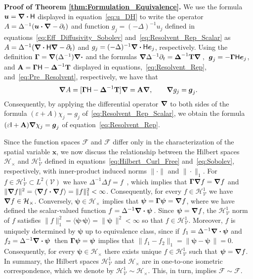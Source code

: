 \documentclass[leqno,onefignum,onetabnum]{siamltex1213}
\newcommand{\Tb}{\mathbf{T}}
\newcommand{\Ab}{\mathbf{A}}
\newcommand{\Vc}{\mathcal{V}}
\newcommand{\Hc}{\mathcal{H}}
\newcommand{\Fc}{\mathcal{F}}
\newcommand{\Hm}{\mathsf{H}}
\newcommand{\Ib}{\mathsf{I}}
\newcommand{\Hs}{\mathscr{H}}
\newcommand{\Fs}{\mathscr{F}}
\newcommand\bDelta{\mbox{\boldmath${\Delta}$}}
\newcommand\bGamma{\mbox{\boldmath${\Gamma}$}}
\newcommand\bnabla{\mbox{\boldmath${\nabla}$}}
\providecommand\bcdot{\boldsymbol{\cdot}}
\newcommand{\vecg}{\boldsymbol{g}}
\newcommand{\vecx}{\boldsymbol{x}}
\newcommand{\vecu}{\boldsymbol{u}}
\newcommand{\vece}{\boldsymbol{e}}
\newcommand{\vecpsi}{\boldsymbol{\psi}}
\begin{document}
\textbf{Proof of Theorem \ref{thm:Formulation_Equivalence}.}\hspace{1ex}
%
We use the formula $\vecu =\bnabla \bcdot\Hm$ displayed in
equation~\eqref{eq:u_DH} to write the operator $A=\Delta^{-1}(\vecu
\bcdot\bnabla -\partial_t)$ 
and function $g_j=(-\Delta)^{-1}u_j$ defined in
equations~\eqref{eq:Eff_Diffusivity_Sobolev}
and~\eqref{eq:Resolvent_Rep_Scalar} 
as $A=\Delta^{-1}(\bnabla \bcdot\Hm\bnabla -\partial_t)$ and
$g_j=(-\Delta)^{-1}\bnabla \bcdot\Hm\vece _j$, respectively. Using the definition
$\bGamma=\bnabla (\Delta^{-1})\bnabla \bcdot$ and the formulas
$\bnabla \Delta^{-1}\partial_t=\bDelta^{-1}\Tb\bnabla \,$,
$\;\vecg_j=-\bGamma\Hm\vece _j$, and $\Ab=\bGamma\Hm-\bDelta^{-1}\Tb$
displayed in equations,~\eqref{eq:Resolvent_Rep},
and~\eqref{eq:Pre_Resolvent}, respectively, we have that    
%
\begin{align}\label{eq:A_Ab_Relation}
  \bnabla A=[\bGamma\Hm-\bDelta^{-1}\Tb]\bnabla =\Ab\bnabla , \qquad
  \bnabla g_j=\vecg_j.
\end{align}
%
Consequently, by applying the
differential operator $\bnabla $ to both sides of the formula
$(\varepsilon+A)\chi_j=g_j$ of~\eqref{eq:Resolvent_Rep_Scalar}, we obtain the
formula  $(\varepsilon\Ib+\Ab)\bnabla \chi_j=\vecg_j$ of
equation~\eqref{eq:Resolvent_Rep}. 



Since the function spaces $\Fs$ and $\Fc$ differ
only in the characterization of the spatial variable $\vecx$, we now
discuss the relationship between the Hilbert spaces $\Hc_\times$ and
$\Hs^1_{\Vc}$ defined in equations~\eqref{eq:Hilbert_Curl_Free}
and~\eqref{eq:Sobolev}, respectively, with inner-product induced norms 
$\|\cdot\|$ and $\|\cdot\|_1$. For $f\in\Hs^1_{\Vc}\subset L^2(\Vc)$ we have 
$\Delta^{-1}\Delta f=f$~\cite{Stakgold:BVP:2000}, which implies that
$\bGamma\bnabla f=\bnabla f$ and
$\|\bnabla f\|^2=\langle\bnabla f\bcdot\bnabla f\rangle=\|f\|_1^2<\infty$. Consequently, for every  
$f\in\Hs^1_{\Vc}$ we have $\bnabla f\in\Hc_\times$. Conversely,
$\vecpsi\in\Hc_\times$ implies that $\vecpsi=\bGamma\vecpsi=\bnabla f$, where
we have defined the scalar-valued function
$f=\Delta^{-1}\bnabla \bcdot\vecpsi\,$. Since $\vecpsi=\bnabla f$, the
$\Hs^1_{\Vc}$ norm of $f$ satisfies
$\|f\|_1^2=\langle\vecpsi\bcdot\vecpsi\rangle=\|\vecpsi\,\|^2<\infty$ so that
$f\in\Hs^1_{\Vc}$. Moreover, $f$ is uniquely determined by $\vecpsi$ up
to equivalence class, since if $f_1=\Delta^{-1}\bnabla \bcdot\vecpsi$ and
$f_2=\Delta^{-1}\bnabla \bcdot\vecpsi\,$ then $\bGamma\vecpsi=\vecpsi$ implies
that $\|f_1-f_2\|_1=\|\vecpsi-\vecpsi\,\|=0$. Consequently, for every  
$\vecpsi\in\Hc_\times$ there exists unique $f\in\Hs^1_{\Vc}$ such that
$\vecpsi=\bnabla f$.  In summary, the Hilbert spaces $\Hs^1_{\Vc}$ and
$\Hc_\times$ are in one-to-one isometric correspondence, which we denote by
$\Hs^1_{\Vc}\sim\Hc_\times$. This, in turn, implies  $\Fs\sim\Fc$.  
\end{document}
